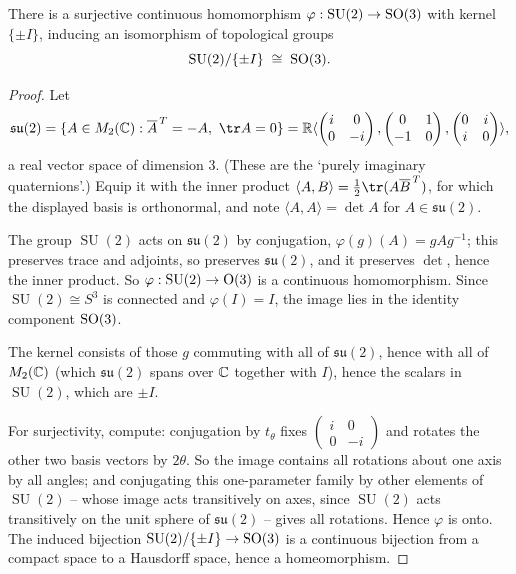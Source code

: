 \documentclass[a4paper]{scrartcl}
\newcommand{\SU}{\operatorname{SU}}
\newcommand{\ip}[2]{\langle #1, #2 \rangle}
\newcommand{\gen}[1]{\langle #1 \rangle}
\begin{document}
\begin{theorem}
	There is a surjective continuous homomorphism $\varphi : \SU(2)\to\SO(3)$ with kernel $\{\pm I\}$, inducing an isomorphism of topological groups
	$$\SU(2)/\{\pm I\}\;\cong\;\SO(3).$$
\end{theorem}
\begin{proof}
	Let
	$$\mathfrak{su}(2) = \{A\in M_2(\C) : \overline A^{\,T} = -A,\ \tr A = 0\} = \R\gen{\begin{pmatrix}i&0\\0&-i\end{pmatrix},\begin{pmatrix}0&1\\-1&0\end{pmatrix},\begin{pmatrix}0&i\\i&0\end{pmatrix}},$$
	a real vector space of dimension $3$. (These are the `purely imaginary quaternions'.) Equip it with the inner product $\ip AB = \frac12\tr(A\overline B^{\,T})$, for which the displayed basis is orthonormal, and note $\ip AA = \det A$ for $A\in\mathfrak{su}(2)$.

	The group $\SU(2)$ acts on $\mathfrak{su}(2)$ by conjugation, $\varphi(g)(A) = gAg^{-1}$; this preserves trace and adjoints, so preserves $\mathfrak{su}(2)$, and it preserves $\det$, hence the inner product. So $\varphi : \SU(2)\to\OO(3)$ is a continuous homomorphism. Since $\SU(2)\cong S^3$ is connected and $\varphi(I) = I$, the image lies in the identity component $\operatorname{SO}(3)$.

	The kernel consists of those $g$ commuting with all of $\mathfrak{su}(2)$, hence with all of $M_2(\mathbb{C})$ (which $\mathfrak{su}(2)$ spans over $\mathbb{C}$ together with $I$), hence the scalars in $\SU(2)$, which are $\pm I$.

	For surjectivity, compute: conjugation by $t_\theta$ fixes $\left(\begin{smallmatrix}i&0\\0&-i\end{smallmatrix}\right)$ and rotates the other two basis vectors by $2\theta$. So the image contains all rotations about one axis by all angles; and conjugating this one-parameter family by other elements of $\SU(2)$ -- whose image acts transitively on axes, since $\SU(2)$ acts transitively on the unit sphere of $\mathfrak{su}(2)$ -- gives all rotations. Hence $\varphi$ is onto. The induced bijection $\SU(2)/\{\pm I\}\to\SO(3)$ is a continuous bijection from a compact space to a Hausdorff space, hence a homeomorphism.
\end{proof}
\end{document}
